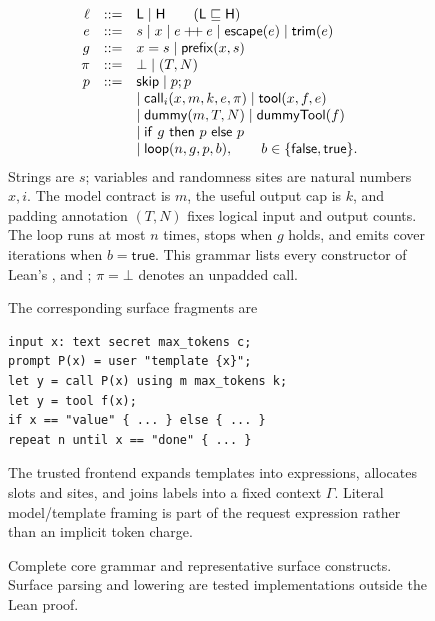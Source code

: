 \begin{figure}[p]
\small
\[
\begin{array}{rcl}
\ell&::=&\mathsf{L}\mid\mathsf{H}\qquad(\mathsf{L}\sqsubseteq\mathsf{H})\\
e&::=&s\mid x\mid e\mathbin{+\!+}e\mid\mathsf{escape}(e)\mid\mathsf{trim}(e)\\
g&::=&x=s\mid\mathsf{prefix}(x,s)\\
\pi&::=&\bot\mid(T,N)\\
p&::=&\mathsf{skip}\mid p;p\\
 &&\mid\mathsf{call}_{i}(x,m,k,e,\pi)\mid\mathsf{tool}(x,f,e)\\
 &&\mid\mathsf{dummy}(m,T,N)\mid\mathsf{dummyTool}(f)\\
 &&\mid\mathsf{if}\ g\ \mathsf{then}\ p\ \mathsf{else}\ p\\
 &&\mid\mathsf{loop}(n,g,p,b),\qquad b\in\{\mathsf{false},\mathsf{true}\}.
\end{array}
\]
Strings are $s$; variables and randomness sites are natural numbers $x,i$.
The model contract is $m$, the useful output cap is $k$, and padding annotation
$(T,N)$ fixes logical input and output counts. The loop runs at most $n$ times,
stops when $g$ holds, and emits cover iterations when $b=\mathsf{true}$.
This grammar lists every constructor of Lean's ,  and
; $\pi=\bot$ denotes an unpadded call.

The corresponding surface fragments are
\begin{lstlisting}[basicstyle=\ttfamily\footnotesize]
input x: text secret max_tokens c;
prompt P(x) = user "template {x}";
let y = call P(x) using m max_tokens k;
let y = tool f(x);
if x == "value" { ... } else { ... }
repeat n until x == "done" { ... }
\end{lstlisting}
The trusted frontend expands templates into expressions, allocates slots and
sites, and joins labels into a fixed context $\Gamma$. Literal model/template
framing is part of the request expression rather than an implicit token charge.
\caption{Complete core grammar and representative surface constructs. Surface
parsing and lowering are tested implementations outside the Lean proof.}
\label{fig:grammar}
\end{figure}
